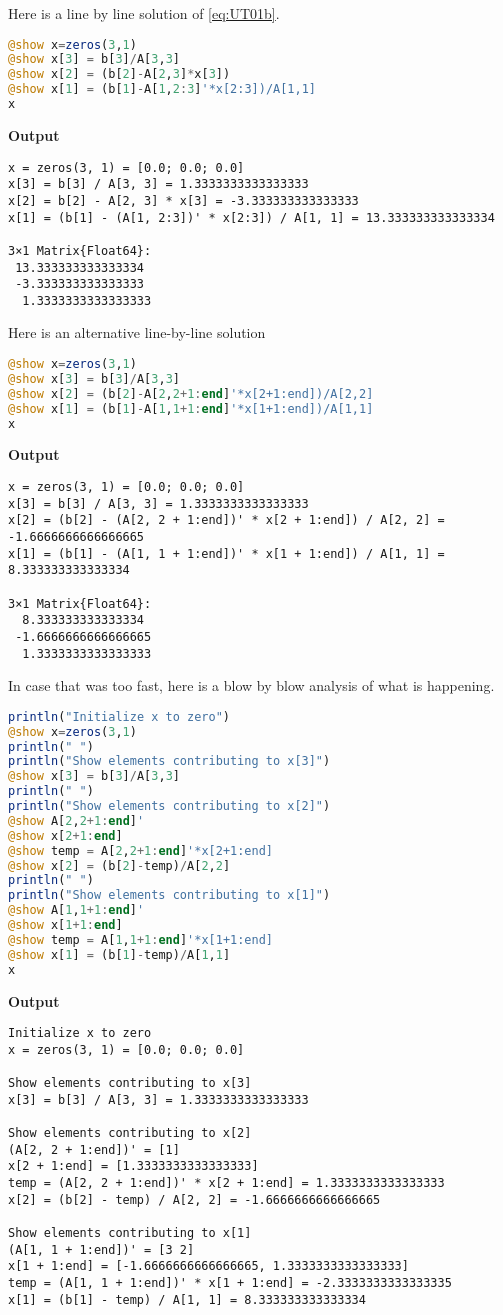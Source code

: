 Here is a line by line solution of \eqref{eq:UT01b}.\\

\begin{lstlisting}[language=Julia,style=mystyle]
@show x=zeros(3,1)
@show x[3] = b[3]/A[3,3]
@show x[2] = (b[2]-A[2,3]*x[3])
@show x[1] = (b[1]-A[1,2:3]'*x[2:3])/A[1,1]
x
\end{lstlisting}
\textbf{Output} 
\begin{verbatim}
x = zeros(3, 1) = [0.0; 0.0; 0.0]
x[3] = b[3] / A[3, 3] = 1.3333333333333333
x[2] = b[2] - A[2, 3] * x[3] = -3.333333333333333
x[1] = (b[1] - (A[1, 2:3])' * x[2:3]) / A[1, 1] = 13.333333333333334

3×1 Matrix{Float64}:
 13.333333333333334
 -3.333333333333333
  1.3333333333333333
\end{verbatim}

Here is an alternative line-by-line solution 
\begin{lstlisting}[language=Julia,style=mystyle]
@show x=zeros(3,1)
@show x[3] = b[3]/A[3,3]
@show x[2] = (b[2]-A[2,2+1:end]'*x[2+1:end])/A[2,2]
@show x[1] = (b[1]-A[1,1+1:end]'*x[1+1:end])/A[1,1]
x
\end{lstlisting}
\textbf{Output} 
\begin{verbatim}
x = zeros(3, 1) = [0.0; 0.0; 0.0]
x[3] = b[3] / A[3, 3] = 1.3333333333333333
x[2] = (b[2] - (A[2, 2 + 1:end])' * x[2 + 1:end]) / A[2, 2] = -1.6666666666666665
x[1] = (b[1] - (A[1, 1 + 1:end])' * x[1 + 1:end]) / A[1, 1] = 8.333333333333334

3×1 Matrix{Float64}:
  8.333333333333334
 -1.6666666666666665
  1.3333333333333333
\end{verbatim}

In case that was too fast, here is a blow by blow analysis of what is happening. 

\begin{lstlisting}[language=Julia,style=mystyle]
println("Initialize x to zero")
@show x=zeros(3,1)
println(" ")
println("Show elements contributing to x[3]")
@show x[3] = b[3]/A[3,3]
println(" ")
println("Show elements contributing to x[2]")
@show A[2,2+1:end]'
@show x[2+1:end]
@show temp = A[2,2+1:end]'*x[2+1:end]
@show x[2] = (b[2]-temp)/A[2,2]
println(" ")
println("Show elements contributing to x[1]")
@show A[1,1+1:end]'
@show x[1+1:end]
@show temp = A[1,1+1:end]'*x[1+1:end]
@show x[1] = (b[1]-temp)/A[1,1]
x
\end{lstlisting}
\textbf{Output} 
\begin{verbatim}
Initialize x to zero
x = zeros(3, 1) = [0.0; 0.0; 0.0]
 
Show elements contributing to x[3]
x[3] = b[3] / A[3, 3] = 1.3333333333333333
 
Show elements contributing to x[2]
(A[2, 2 + 1:end])' = [1]
x[2 + 1:end] = [1.3333333333333333]
temp = (A[2, 2 + 1:end])' * x[2 + 1:end] = 1.3333333333333333
x[2] = (b[2] - temp) / A[2, 2] = -1.6666666666666665
 
Show elements contributing to x[1]
(A[1, 1 + 1:end])' = [3 2]
x[1 + 1:end] = [-1.6666666666666665, 1.3333333333333333]
temp = (A[1, 1 + 1:end])' * x[1 + 1:end] = -2.3333333333333335
x[1] = (b[1] - temp) / A[1, 1] = 8.333333333333334
\end{verbatim}


